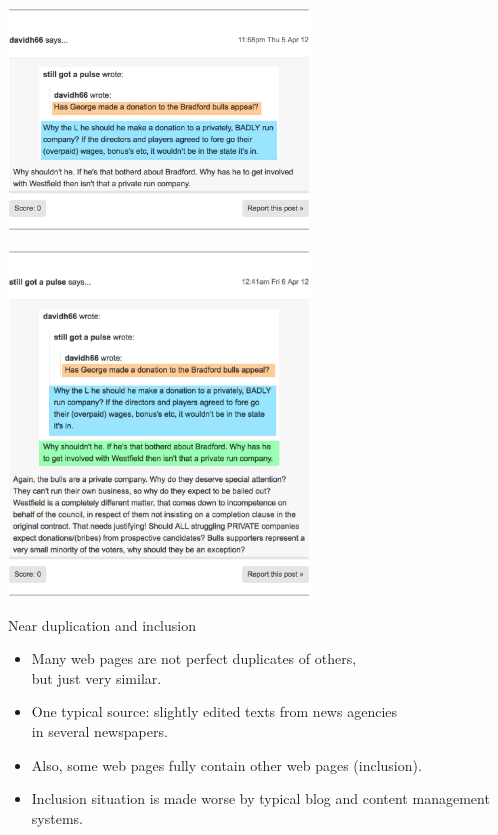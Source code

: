  \begin{frame}
   \begin{center}
     \includegraphics[width=8cm]{graphicswcc/george3col2}\\
   \end{center}
 \end{frame}


 \begin{frame}
   
  \begin{center}
     \includegraphics[width=8cm]{graphicswcc/george4col}\\
   \end{center}

 \end{frame}



\begin{frame}
  {Near duplication and inclusion}
  \begin{itemize}
    \item Many web pages are not perfect duplicates of others,\\
      but just \alert{very similar}.
    \item One typical source: slightly edited texts from news agencies\\
      in several newspapers.
    \item Also, some web pages fully contain other web pages (\alert{inclusion}).
    \item Inclusion situation is made worse by typical blog and content management systems.
  \end{itemize}
\end{frame}


